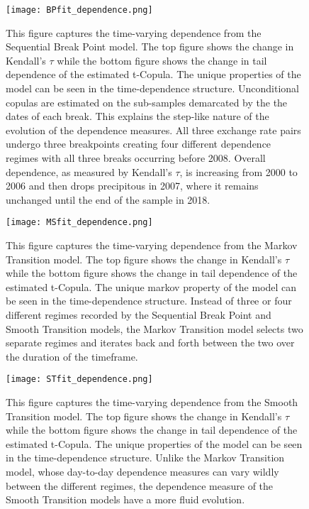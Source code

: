 \begin{figure}
    \centering
    \texttt{[image: BPfit\_dependence.png]}
    \caption{This figure captures the time-varying dependence from the Sequential Break Point model. The top figure shows the change in Kendall's $\tau$ while the bottom figure shows the change in tail dependence of the estimated t-Copula. The unique properties of the model can be seen in the time-dependence structure. Unconditional copulas are estimated on the sub-samples demarcated by the the dates of each break. This explains the step-like nature of the evolution of the dependence measures. All three exchange rate pairs undergo three breakpoints creating four different dependence regimes with all three breaks occurring before 2008. Overall dependence, as measured by Kendall's $\tau$, is increasing from 2000 to 2006 and then drops precipitous in 2007, where it remains unchanged until the end of the sample in 2018.}
    \label{fig:BPfit_dependence}
\end{figure}

\begin{figure}
    \centering
    \texttt{[image: MSfit\_dependence.png]}
    \caption{This figure captures the time-varying dependence from the Markov Transition model. The top figure shows the change in Kendall's $\tau$ while the bottom figure shows the change in tail dependence of the estimated t-Copula. The unique markov property of the model can be seen in the time-dependence structure. Instead of three or four different regimes recorded by the Sequential Break Point and Smooth Transition models, the Markov Transition model selects two separate regimes and iterates back and forth between the two over the duration of the timeframe.}
    \label{fig:MSfit_dependence}
\end{figure}

\begin{figure}
    \centering
    \texttt{[image: STfit\_dependence.png]}
    \caption{This figure captures the time-varying dependence from the Smooth Transition model. The top figure shows the change in Kendall's $\tau$ while the bottom figure shows the change in tail dependence of the estimated t-Copula. The unique properties of the model can be seen in the time-dependence structure. Unlike the Markov Transition model, whose day-to-day dependence measures can vary wildly between the different regimes, the dependence measure of the Smooth Transition models have a more fluid evolution.}
    \label{fig:STfit_dependence}
\end{figure}

